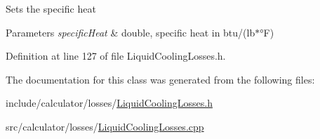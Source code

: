 Sets the specific heat 
\begin{DoxyParams}{Parameters}
{\em specific\+Heat} & double, specific heat in btu/(lb$\ast$°F) \\
\hline
\end{DoxyParams}


Definition at line 127 of file Liquid\+Cooling\+Losses.\+h.



The documentation for this class was generated from the following files\+:\begin{DoxyCompactItemize}
\item 
include/calculator/losses/\hyperlink{_liquid_cooling_losses_8h}{Liquid\+Cooling\+Losses.\+h}\item 
src/calculator/losses/\hyperlink{_liquid_cooling_losses_8cpp}{Liquid\+Cooling\+Losses.\+cpp}\end{DoxyCompactItemize}
